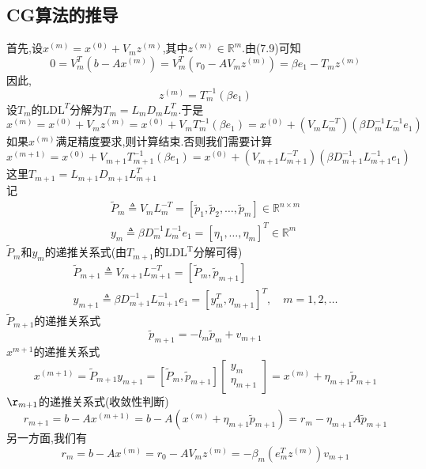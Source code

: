 \documentclass[12pt,a4paper]{article}
\begin{document}
\subsection*{CG算法的推导}
首先,设$x^{(m)}=x^{(0)}+V_{m} z^{(m)}$,其中$z^{(m)} \in \mathbb{R}^{m}$.由(7.9)可知
$$
0=V_{m}^{T}\left(b-A x^{(m)}\right)=V_{m}^{T}\left(r_{0}-A V_{m} z^{(m)}\right)=\beta e_{1}-T_{m} z^{(m)}
$$
因此,
$$
z^{(m)}=T_{m}^{-1}\left(\beta e_{1}\right)
$$
设$T_{m}$的$\mathrm{LDL}^{T}$分解为$T_{m}=L_{m} D_{m} L_{m}^{T}$.于是
$$
x^{(m)}=x^{(0)}+V_{m} z^{(m)}=x^{(0)}+V_{m} T_{m}^{-1}\left(\beta e_{1}\right)=x^{(0)}+\left(V_{m} L_{m}^{-T}\right)\left(\beta D_{m}^{-1} L_{m}^{-1} e_{1}\right)
$$
如果$x^{(m)}$满足精度要求,则计算结束.否则我们需要计算
$$
x^{(m+1)}=x^{(0)}+V_{m+1} T_{m+1}^{-1}\left(\beta e_{1}\right)=x^{(0)}+\left(V_{m+1} L_{m+1}^{-T}\right)\left(\beta D_{m+1}^{-1} L_{m+1}^{-1} e_{1}\right)
$$
这里$T_{m+1}=L_{m+1} D_{m+1} L_{m+1}^{T}$\\
记
$$
\begin{array}{l}{\tilde{P}_{m} \triangleq V_{m} L_{m}^{-T}=\left[\tilde{p}_{1}, \tilde{p}_{2}, \ldots, \tilde{p}_{m}\right] \in \mathbb{R}^{n \times m}} \\ 
{y_{m} \triangleq \beta D_{m}^{-1} L_{m}^{-1} e_{1}=\left[\eta_{1}, \ldots, \eta_{m}\right]^{T} \in \mathbb{R}^{m}}\end{array}
$$
{\color{blue}$\tilde{P}_{m}$和$y_{m}$的递推关系式}(由$T_{m+1}$的$\mathrm{LDL}^{\mathrm{T}}$分解可得)
$$
\begin{array}{l}{\tilde{P}_{m+1} \triangleq V_{m+1} L_{m+1}^{-T}=\left[\tilde{P}_{m}, \tilde{p}_{m+1}\right]} \\ {y_{m+1} \triangleq \beta D_{m+1}^{-1} L_{m+1}^{-1} e_{1}=\left[y_{m}^{T}, \eta_{m+1}\right]^{T}, \quad m=1,2, \ldots}\end{array}
$$
{\color{blue}$\tilde{P}_{m+1}$的递推关系式}
$$
\tilde{p}_{m+1}=-l_{m} \tilde{p}_{m}+v_{m+1}
$$
{\color{blue}$x^{m+1}$的递推关系式}\\
$$
x^{(m+1)}=\tilde{P}_{m+1} y_{m+1}=\left[\tilde{P}_{m}, \tilde{p}_{m+1}\right]\left[\begin{array}{c}{y_{m}} \\ {\eta_{m+1}}\end{array}\right]=x^{(m)}+\eta_{m+1} \tilde{p}_{m+1}
$$
{\color{blue}$\r_{m+1}$的递推关系式}(收敛性判断)
$$
r_{m+1}=b-A x^{(m+1)}=b-A\left(x^{(m)}+\eta_{m+1} \tilde{p}_{m+1}\right)=r_{m}-\eta_{m+1} A \tilde{p}_{m+1}
$$
另一方面,我们有
$$
r_{m}=b-A x^{(m)}=r_{0}-A V_{m} z^{(m)}=-\beta_{m}\left(e_{m}^{T} z^{(m)}\right) v_{m+1}
$$
\end{document}
